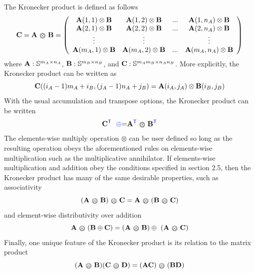 The Kronecker product is defined as follows
  $$
    {\bf C} = {\bf A} ~ \text{\footnotesize \textcircled{\raisebox{-0.3pt}{\footnotesize $\otimes$}}} ~ {\bf B} = \left(
     \begin{array}{cccc}
        {\bf A}(1,1) \otimes {\bf B} & {\bf A}(1,2) \otimes {\bf B} & ... & {\bf A}(1,n_A) \otimes {\bf B} \\
        {\bf A}(2,1) \otimes {\bf B} & {\bf A}(2,2) \otimes {\bf B} & ... & {\bf A}(2,n_A) \otimes {\bf B} \\
         \vdots   &  \vdots   &     & \vdots \\
        {\bf A}(m_A,1) \otimes {\bf B} & {\bf A}(m_A,2) \otimes {\bf B} & ... & {\bf A}(m_A,n_A) \otimes {\bf B} \\
     \end{array}  \right)
  $$
where ${\bf A} : {\mathbb S}^{m_A \times n_A}$, ${\bf B} : {\mathbb S}^{m_B \times n_B}$, and
${\bf C} : {\mathbb S}^{m_A m_B \times n_A n_B}$.  More explicitly, the Kronecker product can be written as
  $$
    {\bf C}((i_A-1) m_A + i_B,(j_A-1) n_A + j_B) = {\bf A}(i_A,j_A) \otimes {\bf B}(i_B,j_B)
  $$
With the usual accumulation and transpose options, the Kronecker product can be written
  $$
    {\bf C}^{\textcolor{blue}{\sf T}} ~~ {\textcolor{blue}{\oplus}}{=} {\bf A}^{\textcolor{blue}{\sf T}} ~ \text{\footnotesize \textcircled{\raisebox{-0.3pt}{\footnotesize $\otimes$}}} ~ {\bf B}^{\textcolor{blue}{\sf T}}
  $$
The elements-wise multiply operation $\otimes$ can be user defined so long as the resulting operation obeys the aforementioned rules on elements-wise multiplication such as the multiplicative annihilator.  If  elements-wise multiplication and addition obey the conditions specified in section 2.5, then the Kronecker product has many of the same desirable properties, such as associativity
  $$
    ({\bf A} ~ \text{\footnotesize \textcircled{\raisebox{-0.3pt}{\footnotesize $\otimes$}}} ~ {\bf B}) ~ \text{\footnotesize \textcircled{\raisebox{-0.3pt}{\footnotesize $\otimes$}}} ~ {\bf C} = 
    {\bf A} ~ \text{\footnotesize \textcircled{\raisebox{-0.3pt}{\footnotesize $\otimes$}}} ~ ({\bf B} ~ \text{\footnotesize \textcircled{\raisebox{-0.3pt}{\footnotesize $\otimes$}}} ~ {\bf C})
  $$
and element-wise distributivity over addition
 $$
    {\bf A} ~ \text{\footnotesize \textcircled{\raisebox{-0.3pt}{\footnotesize $\otimes$}}} ~ ({\bf B} \oplus {\bf C}) = 
    ({\bf A} ~ \text{\footnotesize \textcircled{\raisebox{-0.3pt}{\footnotesize $\otimes$}}} ~ {\bf B}) \oplus ~ ({\bf A} ~ \text{\footnotesize \textcircled{\raisebox{-0.3pt}{\footnotesize $\otimes$}}} ~ {\bf C})
  $$
Finally, one unique feature of the Kronecker product is its relation to the matrix product
  $$
    ({\bf A} ~ \text{\footnotesize \textcircled{\raisebox{-0.3pt}{\footnotesize $\otimes$}}} ~ {\bf B}) ({\bf C} ~ \text{\footnotesize \textcircled{\raisebox{-0.3pt}{\footnotesize $\otimes$}}} ~ {\bf D})
     = 
     ({\bf A} {\bf C}) ~ \text{\footnotesize \textcircled{\raisebox{-0.3pt}{\footnotesize $\otimes$}}} ~ ({\bf B} {\bf D})
   $$

